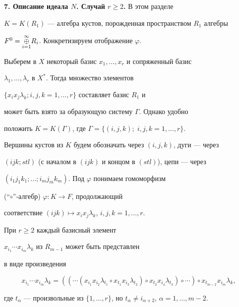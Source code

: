 {\bf 7. Описание идеала $N$. Случай $r\ge 2$.} В этом разделе


$K=K(R_1)$ --- алгебра кустов, порожденная пространством $R_1$ алгебры


$F^0=\underset{i=1}{\overset{\infty }{\oplus}}{}R_i$. Конкретизируем отображение $\varphi $.


Выберем в $X$ некоторый базис $x_1,\dotsc ,x_r$ и сопряженный базис


$\lambda _1,\dotsc ,\lambda _r$ в $X^*$. Тогда множество элементов


$\{x_ix_j\lambda _k; i,j,k=1,\dotsc ,r\}$ составляет базис $R_1$ и


может быть взято за образующую систему $\Gamma $. Однако удобно


положить $K=K(\Gamma )$, где $\Gamma =\{(i,j,k);\; i,j,k=1,\dotsc ,r\}$.


Вершины кустов из $K$ будем обозначать через $(i,j,k)$, дуги --- через


$(ijk;stl)$ (с началом в $(ijk)$ и концом в $(stl)$), цепи --- через


$(i_1j_1k_1;\dotsc ;i_mj_mk_m)$. Под $\varphi $ понимаем гомоморфизм


(``$\circ$''-алгебр) $\varphi : K \rightarrow F$, продолжающий


соответствие $(ijk)\mapsto x_ix_j\lambda _k$, $i,j,k=1,\dotsc ,r$.





\begin{lem} При $r\ge 2$ каждый базисный элемент


$x_{i_1}\dotsb x_{i_m}\lambda _k$ из $R_{m-1}$ может быть представлен


в виде произведения


$$


x_{i_1}\dotsb x_{i_m}\lambda _k =


((\dotsb (x_{i_1}x_{i_2}\lambda _{t_1}\circ x_{t_1}x_{i_3}\lambda _{t_2})


\circ x_{t_2}x_{i_4}\lambda _{t_3})\circ \dotsb )\circ


x_{t_{m-2}}x_{i_m}\lambda _k,


$$


где $t_{\alpha }$ --- произвольные из $\{1,\dotsc ,r\}$, но $t_{\alpha }


\ne i_{\alpha +2}$, $\alpha =1,\dotsc ,m-2.$


\end{lem}





